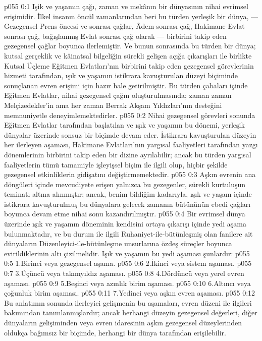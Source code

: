 \vs p055 0:1 Işik ve yaşamın çağı, zaman ve mekânın bir dünyasının nihai evrimsel erişimidir. İlkel insanın öncül zamanlarından beri bu türden yerleşik bir dünya, --- Gezegensel Prens öncesi ve sonrası çağlar, Âdem sonrası çağ, Hakimane Evlat sonrası çağ, bağışlanmış Evlat sonrası çağ olarak --- birbirini takip eden gezegensel çağlar boyunca ilerlemiştir. Ve bunun sonrasında bu türden bir dünya; kutsal gerçeklik ve kâinatsal bilgeliğin sürekli gelişen açığa çıkarışları ile birlikte Kutsal Üçleme Eğitmen Evlatları’nın birbirini takip eden gezegensel görevlerinin hizmeti tarafından, ışık ve yaşamın istikrara kavuşturulan düzeyi biçiminde sonuçlanan evren erişimi için hazır hale getirilmiştir. Bu türden çabaları içinde Eğitmen Evlatlar, nihai gezegensel çağın oluşturulmasında; zaman zaman Melçizedekler’in ama her zaman Berrak Akşam Yıldızları’nın desteğini memnuniyetle deneyimlemektedirler.
\vs p055 0:2 Nihai gezegensel görevleri sonunda Eğitmen Evlatlar tarafından başlatılan ve ışık ve yaşamın bu dönemi, yerleşik dünyalar üzerinde sonsuz bir biçimde devam eder. İstikrara kavuşturulan düzeyin her ilerleyen aşaması, Hakimane Evlatları’nın yargısal faaliyetleri tarafından yazgı dönemlerinin birbirini takip eden bir dizine ayrılabilir; ancak bu türden yargısal faaliyetlerin tümü tamamiyle işleyişsel biçim ile ilgili olup, hiçbir şekilde gezegensel etkinliklerin gidişatını değiştirmemektedir.
\vs p055 0:3 Aşkın evrenin ana döngüleri içinde mevcudiyete erişen yalnızca bu gezegenler, sürekli kurtuluşun teminatı altına alınmıştır; ancak, benim bildiğim kadarıyla, ışık ve yaşam içinde istikrara kavuşturulmuş bu dünyalara gelecek zamanın bütününün ebedi çağları boyunca devam etme nihai sonu kazandırılmıştır.
\vs p055 0:4 Bir evrimsel dünya üzerinde ışık ve yaşamın döneminin kendisini ortaya çıkarışı içinde yedi aşama bulunmaktadır, ve bu durum ile ilgili Ruhaniyet\hyp{}ile\hyp{}bütünleşmiş olan fanilere ait dünyaların Düzenleyici\hyp{}ile\hyp{}bütünleşme unsurlarına özdeş süreçler boyunca evirildiklerinin altı çizilmelidir. Işık ve yaşamın bu yedi aşaması şunlardır:
\vs p055 0:5 1.\bibnobreakspace Birinci veya gezegensel aşama.
\vs p055 0:6 2.\bibnobreakspace İkinci veya sistem aşaması.
\vs p055 0:7 3.\bibnobreakspace Üçüncü veya takımyıldız aşaması.
\vs p055 0:8 4.\bibnobreakspace Dördüncü veya yerel evren aşaması.
\vs p055 0:9 5.\bibnobreakspace Beşinci veya azınlık birim aşaması.
\vs p055 0:10 6.\bibnobreakspace Altıncı veya çoğunluk birim aşaması.
\vs p055 0:11 7.\bibnobreakspace Yedinci veya aşkın evren aşaması.
\vs p055 0:12 Bu anlatımın sonunda ilerleyici gelişmenin bu aşamaları, evren düzeni ile ilgileri bakımından tanımlanmışlardır; ancak herhangi düzeyin gezegensel değerleri, diğer dünyaların gelişiminden veya evren idaresinin aşkın gezegensel düzeylerinden oldukça bağımsız bir biçimde, herhangi bir dünya tarafından erişilebilir.
